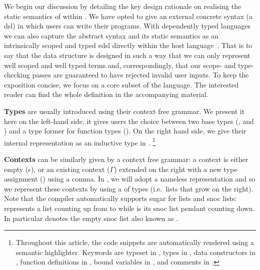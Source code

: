 We begin our discussion by detailing the key design rationale on
realising the static semantics of \Velo{} within \Idris{}.
%
We have opted to give \Velo{} an external concrete syntax (a \ac{dsl})
in which users can write their programs.
%
With dependently typed languages we can also capture
the abstract syntax and its static semantics as an intrinsically
scoped and typed \ac{edsl}
directly within the host language~\cite{Augustsson1999edt}.
%
That is to say that the data structure is designed in such a way that
we can only represent well scoped and well typed terms and, correspondingly,
that our scope- and type- checking passes are guaranteed to have rejected
invalid user inputs.
%
To keep the exposition concise, we focus on a core subset of the
language. The interested reader can find the whole definition
in the accompanying material.

\textbf{Types} are usually introduced using their context free grammar.
%
We present it here on the left-hand side, it gives users the choice between
two base types (\TyNat, and \TyBool) and a type former for function types
(\TyFunc{\cdot}{\cdot}).
%
On the right hand side, we give their internal representation as an inductive
type in \Idris{}.%
\footnote{
Throughout this article, the \Idris{} code snippets are
automatically rendered using a semantic highlighter.
%
Keywords are typeset in ,
types in ,
data constructors in ,
function definitions in ,
bound variables in ,
and comments in .
}

\begin{center}
\begin{minipage}{0.45\textwidth}
\syntaxtypes
\end{minipage}\hfill
\begin{minipage}{0.45\textwidth}
\end{minipage}
\end{center}

\textbf{Contexts} can be similarly given by a context free grammar:
a context is either empty ($\epsilon$), or an existing context ($\Gamma$)
extended on the right with a new type assignment () using a comma.
%
In \Idris{}, we will adopt a nameless representation and so we represent
these contexts by using a  of types
(i.e.\ lists that grow on the right).
%
Note that the \Idris{} compiler automatically supports sugar for lists and
snoc lists: \IdrisData{[1,2,3]} represents a list counting up from
 to  while \IdrisData{[<1,2,3]} is its snoc list
pendant counting down.
%
In particular \IdrisData{[<]} denotes the empty snoc list also known as .

